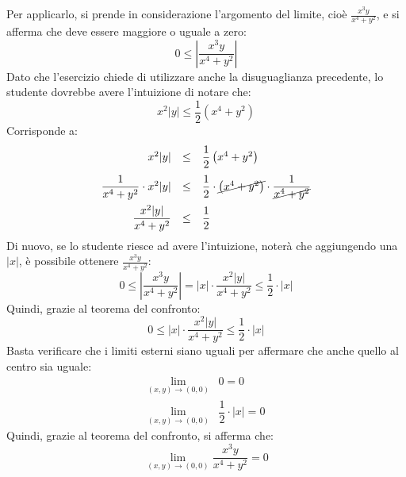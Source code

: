 \documentclass[a4paper]{article}
\begin{document}
	\noindent
	Per applicarlo, si prende in considerazione l'argomento del limite, cioè $\frac{x^{3}y}{x^{4}+y^{2}}$, e si afferma che deve essere maggiore o uguale a zero:
	\begin{equation*}
		0 \le \left| \dfrac{x^{3}y}{x^{4}+y^{2}} \right|
	\end{equation*}
	Dato che l'esercizio chiede di utilizzare anche la disuguaglianza precedente, lo studente dovrebbe avere l'intuizione di notare che:
	\begin{equation*}
		x^{2} |y| \le \dfrac{1}{2}\left(x^{4} + y^{2}\right)
	\end{equation*}
	Corrisponde a:
	\begin{equation*}
		\begin{array}{rcl}
			x^{2} |y| &\le& \dfrac{1}{2}\left(x^{4} + y^{2}\right) \\ [1em]
			\dfrac{1}{x^{4} + y^{2}} \cdot x^{2} |y| &\le& \dfrac{1}{2} \cdot \cancel{\left(x^{4} + y^{2}\right)} \cdot \dfrac{1}{\cancel{x^{4} + y^{2}}} \\ [1em]
			\dfrac{x^{2} |y|}{x^{4} + y^{2}} &\le& \dfrac{1}{2}
		\end{array}
	\end{equation*}
	Di nuovo, se lo studente riesce ad avere l'intuizione, noterà che aggiungendo una $|x|$, è possibile ottenere $\frac{x^{3}y}{x^{4}+y^{2}}$:
	\begin{equation*}
		0 \le \left| \dfrac{x^{3}y}{x^{4}+y^{2}} \right| = |x| \cdot \dfrac{x^{2} |y|}{x^{4} + y^{2}} \le \dfrac{1}{2} \cdot |x|
	\end{equation*}
	Quindi, grazie al teorema del confronto:
	\begin{equation*}
		0 \le |x| \cdot \dfrac{x^{2} |y|}{x^{4} + y^{2}} \le \dfrac{1}{2} \cdot |x|
	\end{equation*}
	Basta verificare che i limiti esterni siano uguali per affermare che anche quello al centro sia uguale:
	\begin{equation*}
		\begin{array}{ll}
			\displaystyle\lim_{\left(x,y\right) \rightarrow \left(0,0\right)} & 0 = 0 \\ [1em]
			\displaystyle\lim_{\left(x,y\right) \rightarrow \left(0,0\right)} & \dfrac{1}{2} \cdot |x| = 0
		\end{array}
	\end{equation*}
	Quindi, grazie al teorema del confronto, si afferma che:
	\begin{equation*}
		\displaystyle\lim_{\left(x,y\right) \rightarrow \left(0,0\right)} \dfrac{x^{3} y}{x^{4} + y^{2}} = 0
	\end{equation*}\newpage
\end{document}
